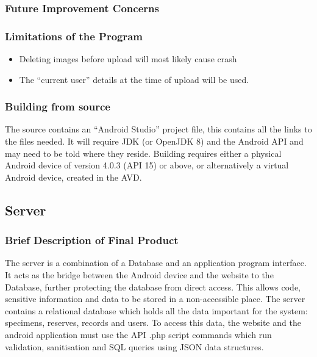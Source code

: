     \subsubsection{Future Improvement Concerns}


    \subsubsection{Limitations of the Program}
        \begin{itemize}
            \item Deleting images before upload will most likely cause crash
            \item The ``current user'' details at the time of upload will be used.
        \end{itemize}

    \subsubsection{Building from source}
        The source contains an ``Android Studio'' project file, this contains all the links to the files needed. It will require JDK (or OpenJDK 8) and the Android API and may need to be told where they reside. Building requires either a physical Android device of version 4.0.3 (API 15) or above, or alternatively a virtual Android device, created in the AVD.





\subsection{Server}
    \subsubsection{Brief Description of Final Product}
The server is a combination of a Database and an application program interface. It acts as the bridge between the Android device and the website to the Database, further protecting the database from direct access. This allows 
code, sensitive information and data to be stored in a non-accessible place. The server contains a relational database which holds all the data important for the system: specimens, reserves, records and users. 
To access this data, the website and the android application must use the API .php script commands which run validation, sanitisation and SQL queries using JSON data structures. 


